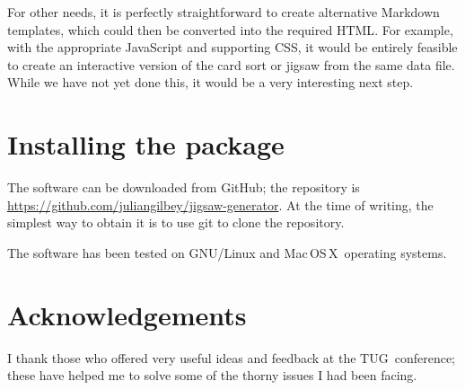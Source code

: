 \documentclass{article}
\def\HTML{{\small HTML}}
\def\MacOSX{Mac\,{\small OS\,X}}
\def\GNU{{\small GNU}}
\def\CSS{{\small CSS}}
\def\TUG{{\small TUG}}
\begin{document}
For other needs, it is perfectly straightforward to create alternative
Markdown templates, which could then be converted into the required
\HTML.  For example, with the appropriate JavaScript and supporting
\CSS, it would be entirely feasible to create an interactive version
of the card sort or jigsaw from the same data file.  While we have not
yet done this, it would be a very interesting next step.

\section{Installing the package}

The software can be downloaded from GitHub; the repository is
\url{https://github.com/juliangilbey/jigsaw-generator}.  At the time
of writing, the simplest way to obtain it is to use git to clone the
repository.

The software has been tested on \GNU/Linux and \MacOSX\ operating
systems.

\smallskip
\section*{Acknowledgements}

I thank those who offered very useful ideas and feedback at the \TUG\
conference; these have helped me to solve some of the thorny issues I
had been facing.

\smallskip


\end{document}
